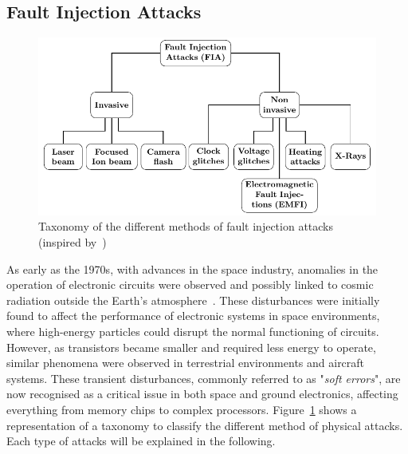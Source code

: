 \subsection{Fault Injection Attacks}

\begin{figure}[ht]
    \centering
    \includegraphics[width=\textwidth, page=1]{c2_soa/img/physicalAttacks.pdf}
    \caption{Taxonomy of the different methods of fault injection attacks (inspired by~\cite{CKNDCTD-21-compsec})}
    \label{fig:arbo_fia}
\end{figure}

As early as the 1970s, with advances in the space industry, anomalies in the operation of electronic circuits were observed and possibly linked to cosmic radiation outside the Earth's atmosphere~\cite{BSH-75-tns,Z-96-ibm,ZL-79-science}. These disturbances were initially found to affect the performance of electronic systems in space environments, where high-energy particles could disrupt the normal functioning of circuits. However, as transistors became smaller and required less energy to operate, similar phenomena were observed in terrestrial environments and aircraft systems. These transient disturbances, commonly referred to as "\textit{soft errors}", are now recognised as a critical issue in both space and ground electronics, affecting everything from memory chips to complex processors. Figure~\ref{fig:arbo_fia} shows a representation of a taxonomy to classify the different method of physical attacks. Each type of attacks will be explained in the following.

